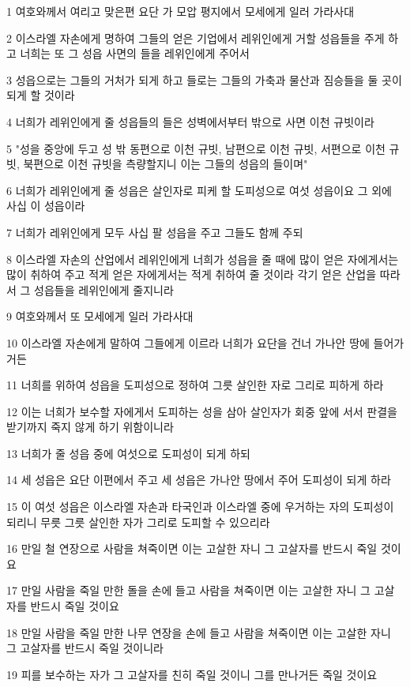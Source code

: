 \par 1 여호와께서 여리고 맞은편 요단 가 모압 평지에서 모세에게 일러 가라사대
\par 2 이스라엘 자손에게 명하여 그들의 얻은 기업에서 레위인에게 거할 성읍들을 주게 하고 너희는 또 그 성읍 사면의 들을 레위인에게 주어서
\par 3 성읍으로는 그들의 거처가 되게 하고 들로는 그들의 가축과 물산과 짐승들을 둘 곳이 되게 할 것이라
\par 4 너희가 레위인에게 줄 성읍들의 들은 성벽에서부터 밖으로 사면 이천 규빗이라
\par 5 "성을 중앙에 두고 성 밖 동편으로 이천 규빗, 남편으로 이천 규빗, 서편으로 이천 규빗, 북편으로 이천 규빗을 측량할지니 이는 그들의 성읍의 들이며"
\par 6 너희가 레위인에게 줄 성읍은 살인자로 피케 할 도피성으로 여섯 성읍이요 그 외에 사십 이 성읍이라
\par 7 너희가 레위인에게 모두 사십 팔 성읍을 주고 그들도 함께 주되
\par 8 이스라엘 자손의 산업에서 레위인에게 너희가 성읍을 줄 때에 많이 얻은 자에게서는 많이 취하여 주고 적게 얻은 자에게서는 적게 취하여 줄 것이라 각기 얻은 산업을 따라서 그 성읍들을 레위인에게 줄지니라
\par 9 여호와께서 또 모세에게 일러 가라사대
\par 10 이스라엘 자손에게 말하여 그들에게 이르라 너희가 요단을 건너 가나안 땅에 들어가거든
\par 11 너희를 위하여 성읍을 도피성으로 정하여 그릇 살인한 자로 그리로 피하게 하라
\par 12 이는 너희가 보수할 자에게서 도피하는 성을 삼아 살인자가 회중 앞에 서서 판결을 받기까지 죽지 않게 하기 위함이니라
\par 13 너희가 줄 성읍 중에 여섯으로 도피성이 되게 하되
\par 14 세 성읍은 요단 이편에서 주고 세 성읍은 가나안 땅에서 주어 도피성이 되게 하라
\par 15 이 여섯 성읍은 이스라엘 자손과 타국인과 이스라엘 중에 우거하는 자의 도피성이 되리니 무릇 그릇 살인한 자가 그리로 도피할 수 있으리라
\par 16 만일 철 연장으로 사람을 쳐죽이면 이는 고살한 자니 그 고살자를 반드시 죽일 것이요
\par 17 만일 사람을 죽일 만한 돌을 손에 들고 사람을 쳐죽이면 이는 고살한 자니 그 고살자를 반드시 죽일 것이요
\par 18 만일 사람을 죽일 만한 나무 연장을 손에 들고 사람을 쳐죽이면 이는 고살한 자니 그 고살자를 반드시 죽일 것이니라
\par 19 피를 보수하는 자가 그 고살자를 친히 죽일 것이니 그를 만나거든 죽일 것이요
